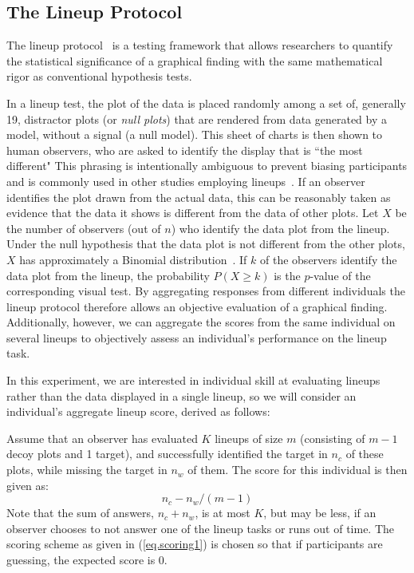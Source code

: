 \documentclass[journal]{vgtc}\usepackage[]{graphicx}\usepackage[]{color}
\begin{document}
\subsection{The Lineup Protocol}
The lineup protocol~\cite{hofmann2012graphical,wickham2010graphical, buja2009statistical} is a testing framework that allows researchers to quantify the statistical significance of a graphical finding with the same mathematical rigor as conventional hypothesis tests.

In a lineup test, the plot of the data is placed randomly among a set of, generally 19, distractor plots (or {\it null plots}) that are rendered from data generated by a model, without a signal (a null model). This sheet of charts is then shown to human observers, who are asked to identify the display that is ``the most different" 
This phrasing is intentionally ambiguous to prevent biasing participants and is commonly used in other studies employing lineups~\cite{wickham2010graphical, majumder2013validation}.
If an observer identifies the plot drawn from the actual data, this can be reasonably taken as evidence that the data it shows is different from the data of other plots.
Let $X$ be the number of observers (out of $n$) who identify the data plot from the lineup. Under the null hypothesis that the data plot is not different from the other plots, $X$ has approximately a Binomial distribution~\cite{wickham2010graphical, majumder2013validation}. If $k$ of the observers identify the data plot from the lineup, the probability $P(X \ge k)$ is the $p$-value of the corresponding visual test. 
%
By aggregating responses from different individuals the lineup protocol therefore allows an objective evaluation of a graphical finding. 
Additionally, however, we can aggregate the scores from the same individual on several lineups to objectively assess an individual's performance on the lineup task. 

In this experiment, we are interested in individual skill at evaluating lineups rather than the data displayed in a single lineup, so we will consider an individual's aggregate lineup score, derived as follows:


Assume that an observer has evaluated $K$ lineups of size $m$ (consisting of $m-1$ decoy plots and 1 target), and successfully identified the target in $n_c$ of these plots, while missing the target in $n_w$ of them. 
The score for this individual is then given as:
\begin{equation}\label{eq.scoring1}
n_c - n_w/(m-1)
\end{equation}
Note that the sum of answers, $n_c + n_w$, is at most $K$, but may be less, if an observer chooses to not answer one of the lineup tasks or runs out of time. The scoring scheme as given in (\ref{eq.scoring1}) is chosen so that if participants are guessing, the expected score is 0. 
\end{document}
